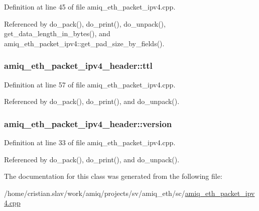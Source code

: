 Definition at line 45 of file amiq\_\-eth\_\-packet\_\-ipv4.cpp.

Referenced by do\_\-pack(), do\_\-print(), do\_\-unpack(), get\_\-data\_\-length\_\-in\_\-bytes(), and amiq\_\-eth\_\-packet\_\-ipv4::get\_\-pad\_\-size\_\-by\_\-fields().\hypertarget{classamiq__eth__packet__ipv4__header_afd5c82dd540f32719d126eab22109646}{
\subsubsection[{ttl}]{ {\bf amiq\_\-eth\_\-packet\_\-ipv4\_\-header::ttl}}}
\label{classamiq__eth__packet__ipv4__header_afd5c82dd540f32719d126eab22109646}


Definition at line 57 of file amiq\_\-eth\_\-packet\_\-ipv4.cpp.

Referenced by do\_\-pack(), do\_\-print(), and do\_\-unpack().\hypertarget{classamiq__eth__packet__ipv4__header_a423a9a3c8cff764466c8e8505175b389}{
\subsubsection[{version}]{ {\bf amiq\_\-eth\_\-packet\_\-ipv4\_\-header::version}}}
\label{classamiq__eth__packet__ipv4__header_a423a9a3c8cff764466c8e8505175b389}


Definition at line 33 of file amiq\_\-eth\_\-packet\_\-ipv4.cpp.

Referenced by do\_\-pack(), do\_\-print(), and do\_\-unpack().

The documentation for this class was generated from the following file:\begin{DoxyCompactItemize}
\item 
/home/cristian.slav/work/amiq/projects/sv/amiq\_\-eth/sc/\hyperlink{amiq__eth__packet__ipv4_8cpp}{amiq\_\-eth\_\-packet\_\-ipv4.cpp}\end{DoxyCompactItemize}
